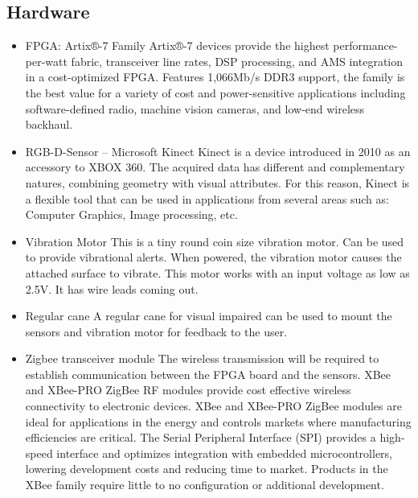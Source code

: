 \documentclass[conference]{IEEEtran}
\begin{document}
\subsection{Hardware}\label{AA}
\begin{itemize}
\item FPGA: Artix®-7 Family Artix®-7 devices provide the highest performance-per-watt fabric, transceiver line rates, DSP processing, and AMS integration in a cost-optimized FPGA. Features 1,066Mb/s DDR3 support, the family is the best value for a variety of cost and power-sensitive applications including software-defined radio, machine vision cameras, and low-end wireless backhaul.
\item RGB-D-Sensor – Microsoft Kinect Kinect is a device introduced in 2010 as an accessory to XBOX 360. The acquired data has different and complementary natures, combining geometry with visual attributes. For this reason, Kinect is a flexible tool that can be used in applications from several areas such as: Computer Graphics, Image processing, etc.
\item Vibration Motor This is a tiny round coin size vibration motor. Can be used to provide vibrational alerts. When powered, the vibration motor causes the attached surface to vibrate. This motor works with an input voltage as low as 2.5V. It has wire leads coming out.
\item Regular cane A regular cane for visual impaired can be used to mount the sensors and vibration motor for feedback to the user.
\item Zigbee transceiver module The wireless transmission will be required to establish communication between the FPGA board and the sensors. XBee and XBee-PRO ZigBee RF modules provide cost effective wireless connectivity to electronic devices. XBee and XBee-PRO ZigBee modules are ideal for applications in the energy and controls markets where manufacturing efficiencies are critical. The Serial Peripheral Interface (SPI) provides a high-speed interface and optimizes integration with embedded microcontrollers, lowering development costs and reducing time to market. Products in the XBee family require little to no configuration or additional development. 
\end{itemize}
\end{document}
